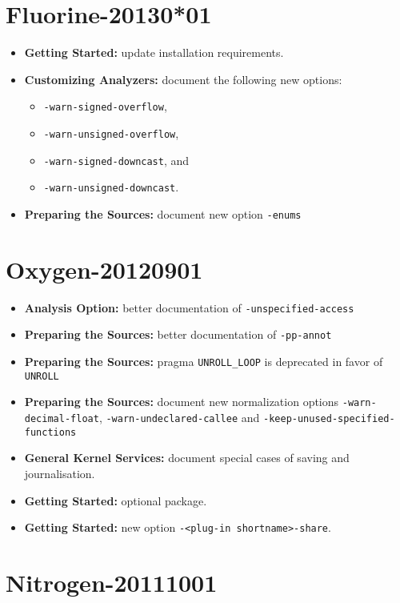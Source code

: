 \section*{Fluorine-20130*01}
\begin{itemize}
\item \textbf{Getting Started:} update installation requirements.
\item \textbf{Customizing Analyzers:} document the following new options:
  \begin{itemize}
  \item \texttt{-warn-signed-overflow},
  \item \texttt{-warn-unsigned-overflow},
  \item \texttt{-warn-signed-downcast}, and
  \item \texttt{-warn-unsigned-downcast}.
  \end{itemize}
\item \textbf{Preparing the Sources:} document new option \texttt{-enums}
\end{itemize}

\section*{Oxygen-20120901}

\begin{itemize}
\item \textbf{Analysis Option:} better documentation of 
\texttt{-unspecified-access}
\item \textbf{Preparing the Sources:} better documentation of \texttt{-pp-annot}
\item \textbf{Preparing the Sources:} pragma \texttt{UNROLL\_LOOP} is
deprecated in favor of \texttt{UNROLL}
\item \textbf{Preparing the Sources:} document new normalization options
  \texttt{-warn-decimal-float}, \texttt{-warn-undeclared-callee} and
  \texttt{-keep-unused-specified-functions}
\item \textbf{General Kernel Services:} document special cases of saving and
  journalisation.
\item \textbf{Getting Started:} optional  package.
\item \textbf{Getting Started:} new option \texttt{-<plug-in shortname>-share}.
\end{itemize}

\section*{Nitrogen-20111001}

